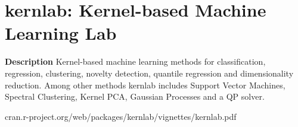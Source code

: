 \section{kernlab: Kernel-based Machine Learning Lab}


\textbf{Description} Kernel-based machine learning methods for classification, regression, clustering, novelty detection, quantile regression and dimensionality reduction. Among other methods kernlab includes Support Vector Machines, Spectral Clustering, Kernel PCA, Gaussian Processes and a QP solver.

cran.r-project.org/web/packages/kernlab/vignettes/kernlab.pdf





